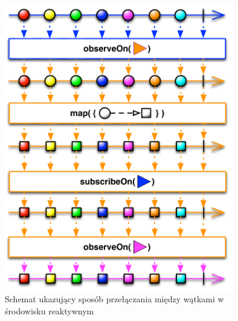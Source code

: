 \documentclass[12pt,oneside,a4paper]{report}
\begin{document}
\begin{figure}[ht!]
	\centering
	\includegraphics[width=10cm]{schedulers}
	\caption{Schemat ukazujący sposób przełączania między wątkami w środowisku reaktywnym}
	\label{schedulers}
\end{figure}
\pagebreak
\end{document}
